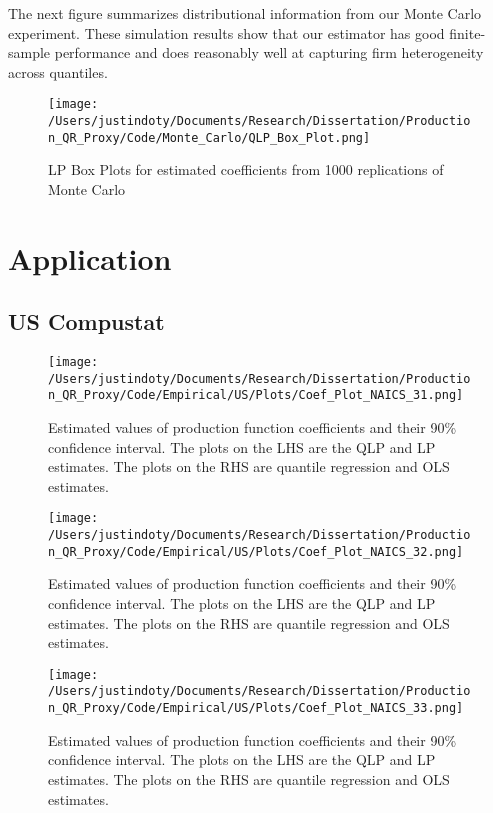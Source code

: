 \documentclass[11pt]{article}
\begin{document}
The next figure summarizes distributional information from our Monte Carlo experiment. These simulation results show that our estimator has good finite-sample performance and does reasonably well at capturing firm heterogeneity across quantiles.

\begin{figure}[H]
\centering
\caption{LP Box Plots for estimated coefficients from 1000 replications of Monte Carlo}
\texttt{[image: /Users/justindoty/Documents/Research/Dissertation/Production\_QR\_Proxy/Code/Monte\_Carlo/QLP\_Box\_Plot.png]}
\label{LP_Box Plot}
\end{figure}

\section{Application} \label{application}

\subsection{US Compustat}




\begin{figure}[H]
\centering
\texttt{[image: /Users/justindoty/Documents/Research/Dissertation/Production\_QR\_Proxy/Code/Empirical/US/Plots/Coef\_Plot\_NAICS\_31.png]}
\caption{Estimated values of production function coefficients and their 90\% confidence interval. The plots on the LHS are the QLP and LP estimates. The plots on the RHS are quantile regression and OLS estimates.}
\end{figure}

\begin{figure}[H]
\centering
\texttt{[image: /Users/justindoty/Documents/Research/Dissertation/Production\_QR\_Proxy/Code/Empirical/US/Plots/Coef\_Plot\_NAICS\_32.png]}
\caption{Estimated values of production function coefficients and their 90\% confidence interval. The plots on the LHS are the QLP and LP estimates. The plots on the RHS are quantile regression and OLS estimates.}
\end{figure}

\begin{figure}[H]
\centering
\texttt{[image: /Users/justindoty/Documents/Research/Dissertation/Production\_QR\_Proxy/Code/Empirical/US/Plots/Coef\_Plot\_NAICS\_33.png]}
\caption{Estimated values of production function coefficients and their 90\% confidence interval. The plots on the LHS are the QLP and LP estimates. The plots on the RHS are quantile regression and OLS estimates.}
\end{figure}
\end{document}
